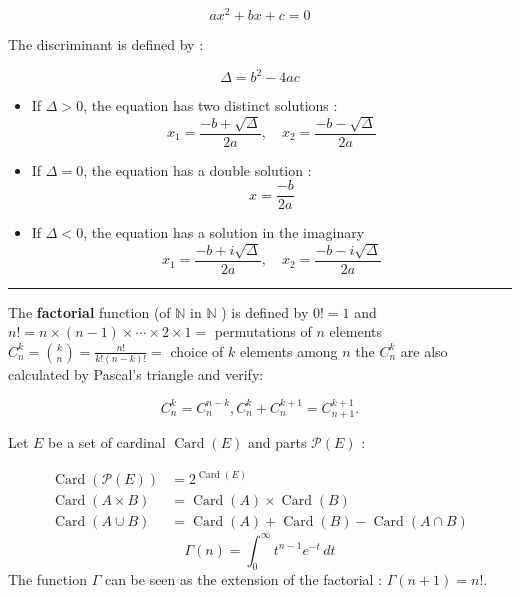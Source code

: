 \begin{f}  
     \[
    ax^2 + bx + c = 0
    \]

    The discriminant is defined by :
    
    \[
    \Delta = b^2 - 4ac
    \]
       
    \begin{itemize}
        \item If \(\Delta > 0\), the equation has two distinct solutions :
        \[
        x_1 = \frac{-b + \sqrt{\Delta}}{2a}, \quad x_2 = \frac{-b - \sqrt{\Delta}}{2a}
        \]
        \item If \(\Delta = 0\), the equation has a double solution :
        \[
        x = \frac{-b}{2a}
        \]
        \item If \(\Delta < 0\), the equation has a solution in the imaginary
        \[
        x_1 = \frac{-b + i\sqrt{\Delta}}{2a}, \quad x_2 = \frac{-b - i\sqrt{\Delta}}{2a}
        \]
    \end{itemize}
\end{f}
\hrule
\begin{f}  

The \textbf{factorial} function (of $\mathbb{N}$ in $\mathbb{N}$ ) is defined by $0!=1$ and $n!=n \times(n-1) \times \cdots \times 2 \times 1=$ permutations of $n$ elements $\displaystyle C_n^k=\binom{k}{n}=\frac{n!}{k!(n-k)!}=$ choice of $k$ elements among $n$ the $C_n^k$ are also calculated by Pascal's triangle and verify:

$$
C_n^k=C_n^{n-k}, C_n^k+C_n^{k+1}=C_{n+1}^{k+1} .
$$


Let $E$ be a set of cardinal $\operatorname{Card}(E)$ and parts $\mathcal{P}(E)$ :

$$
\begin{aligned}
\operatorname{Card}(\mathcal{P}(E)) & =2^{\operatorname{Card}(E)} \\
\operatorname{Card}(A \times B) & =\operatorname{Card}(A) \times \operatorname{Card}(B) \\
\operatorname{Card}(A \cup B) & =\operatorname{Card}(A)+\operatorname{Card}(B)-\operatorname{Card}(A \cap B)
\end{aligned}
$$
\[ \Gamma(n) = \int_0^\infty t^{n-1} e^{-t} \, dt \]
The function $\Gamma$ can be seen as the extension of the factorial : $\Gamma(n+1)=n!$.
\end{f}

